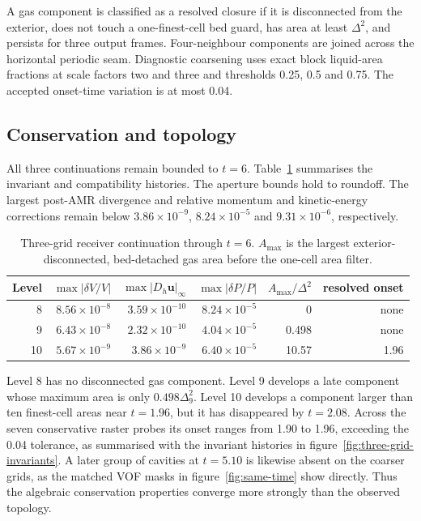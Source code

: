 \documentclass[11pt]{article}
\begin{document}
A gas component is classified as a resolved closure if it is disconnected
from the exterior, does not touch a one-finest-cell bed guard, has area at least
$\Delta^2$, and persists for three output frames.  Four-neighbour components
are joined across the horizontal periodic seam.  Diagnostic coarsening uses
exact block liquid-area fractions at scale factors two and three and thresholds
0.25, 0.5 and 0.75.  The accepted onset-time variation is at most 0.04.

\subsection{Conservation and topology}

All three continuations remain bounded to $t=6$.  Table~\ref{tab:three-grid}
summarises the invariant and compatibility histories.  The aperture bounds
hold to roundoff.  The largest post-AMR divergence and relative momentum and
kinetic-energy corrections remain below $3.86\times10^{-9}$,
$8.24\times10^{-5}$ and $9.31\times10^{-6}$, respectively.

\begin{table}[t]
\centering
\small
\caption{Three-grid receiver continuation through $t=6$.  $A_{\max}$ is the
largest exterior-disconnected, bed-detached gas area before the one-cell area
filter.}
\label{tab:three-grid}
\begin{tabular}{rrrrrr}
\toprule
Level & $\max|\delta V/V|$ & $\max|D_h\boldsymbol u|_\infty$ &
$\max|\delta P/P|$ & $A_{\max}/\Delta^2$ & resolved onset \\
\midrule
8  & $8.56\times10^{-8}$ & $3.59\times10^{-10}$ & $8.24\times10^{-5}$ & 0     & none \\
9  & $6.43\times10^{-8}$ & $2.32\times10^{-10}$ & $4.04\times10^{-5}$ & 0.498 & none \\
10 & $5.67\times10^{-9}$ & $3.86\times10^{-9}$  & $6.40\times10^{-5}$ & 10.57 & 1.96 \\
\bottomrule
\end{tabular}
\end{table}

Level 8 has no disconnected gas component.  Level 9 develops a late component
whose maximum area is only $0.498\Delta_9^2$.  Level 10 develops a component
larger than ten finest-cell areas near $t=1.96$, but it has disappeared by
$t=2.08$.  Across the seven conservative raster probes its onset ranges from
1.90 to 1.96, exceeding the 0.04 tolerance, as summarised with the invariant
histories in figure~\ref{fig:three-grid-invariants}.  A later group of cavities
at $t=5.10$ is likewise absent on the coarser grids, as the matched VOF masks in
figure~\ref{fig:same-time} show directly.  Thus the algebraic conservation
properties converge more strongly than the observed topology.
\end{document}
